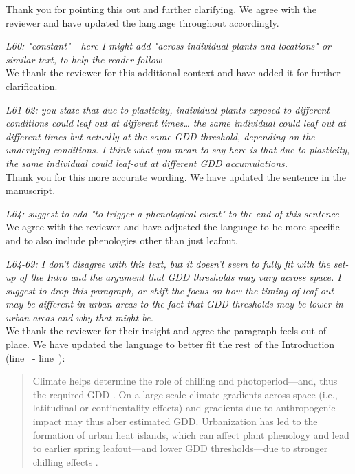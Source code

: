 \documentclass[11pt,a4paper]{article}\usepackage[]{graphicx}\usepackage[]{color}
\newcommand{\lr}[1]{line~\lineref{#1}}
\begin{document}
Thank you for pointing this out and further clarifying. We agree with the reviewer and have updated the language throughout accordingly.

\textit{L60: "constant" - here I might add "across individual plants and locations" or similar text, to help the reader follow} \\

We thank the reviewer for this additional context and have added it for further clarification.

\textit{L61-62: you state that due to plasticity, individual plants exposed to different conditions could leaf out at different times… the same individual could leaf out at different times but actually at the same GDD threshold, depending on the underlying conditions. I think what you mean to say here is that due to plasticity, the same individual could leaf-out at different GDD accumulations.} \\

Thank you for this more accurate wording. We have updated the sentence in the manuscript.

\textit{L64: suggest to add "to trigger a phenological event" to the end of this sentence} \\

We agree with the reviewer and have adjusted the language to be more specific and to also include phenologies other than just leafout. 

\textit{L64-69: I don't disagree with this text, but it doesn't seem to fully fit with the set-up of the Intro and the argument that GDD thresholds may vary across space. I suggest to drop this paragraph, or shift the focus on how the timing of leaf-out may be different in urban areas to the fact that GDD thresholds may be lower in urban areas and why that might be.}\\

We thank the reviewer for their insight and agree the paragraph feels out of place. We have updated the language to better fit the rest of the Introduction (\lr{Z1urban} - \lr{Z1urbanend}):\\

\begin{quotation}
\noindent Climate helps determine the role of chilling and photoperiod---and, thus the required GDD \citep{Bonhomme2000}. On a large scale climate gradients across space (i.e., latitudinal or continentality effects) and gradients due to anthropogenic impact may thus alter estimated GDD. Urbanization has led to the formation of urban heat islands, which can affect plant phenology and lead to earlier spring leafout---and lower GDD thresholds---due to stronger chilling effects \citep{Meng2020}.
\end{quotation}
\end{document}
